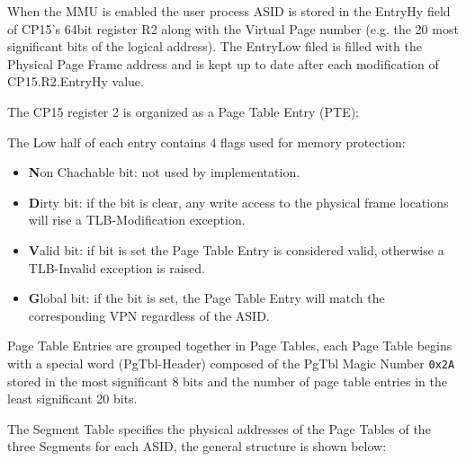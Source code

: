 \vspace{10px}



\vspace{10px}

When the MMU is enabled the user process ASID is stored in the EntryHy field of CP15's 64bit register R2 along with the Virtual Page number (e.g. the 20 most significant bits of the logical address). The EntryLow filed is filled with the Physical Page Frame address and is kept up to date after each modification of CP15.R2.EntryHy value.

The CP15 register 2 is organized as a Page Table Entry (PTE):
\\

\vspace{5px}
\begin{adjustbox}{center}

\end{adjustbox}
\vspace{5px}

The Low half of each entry contains 4 flags used for memory protection:
\begin{itemize}
\item \textbf{N}on Chachable bit: not used by \uarm{} implementation.
\item \textbf{D}irty bit: if the bit is clear, any write access to the physical frame locations will rise a TLB-Modification exception.
\item \textbf{V}alid bit: if bit is set the Page Table Entry is considered valid, otherwise a TLB-Invalid exception is raised.
\item \textbf{G}lobal bit: if the bit is set, the Page Table Entry will match the corresponding VPN regardless of the ASID.
\end{itemize}

Page Table Entries are grouped together in Page Tables, each Page Table begins with a special word (PgTbl-Header) composed of the PgTbl Magic Number \texttt{0x2A} stored in the most significant 8 bits and the number of page table entries in the least significant 20 bits.

The Segment Table specifies the physical addresses of the Page Tables of the three Segments for each ASID, the general structure is shown below:
\\

\vspace{5px}
\begin{adjustbox}{center}

\end{adjustbox}
\vspace{5px}


